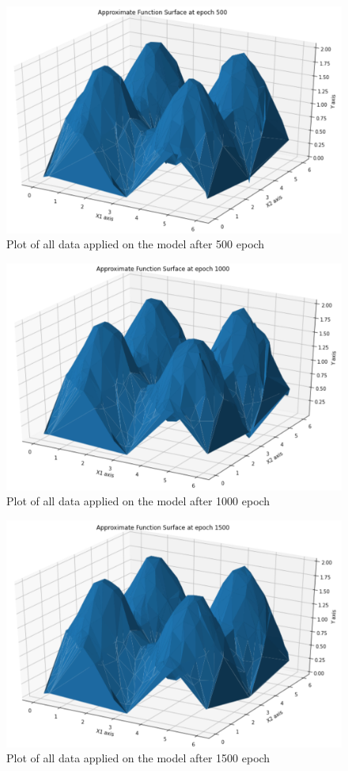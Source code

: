 \documentclass[10pt,a4paper]{article}
\begin{document}
\begin{figure}[htbp]
    \centering
    \includegraphics[width=0.8\linewidth]{Ep500.png}
    \captionsetup{justification=centering}
    \caption{Plot of all data applied on the model after 500 epoch}
\end{figure}
\begin{figure}[htbp]
    \centering
    \includegraphics[width=0.8\linewidth]{Ep1000.png}
    \captionsetup{justification=centering}
    \caption{Plot of all data applied on the model after 1000 epoch}
\end{figure}
\begin{figure}[htbp]
    \centering
    \includegraphics[width=0.8\linewidth]{Ep1500.png}
    \captionsetup{justification=centering}
    \caption{Plot of all data applied on the model after 1500 epoch}
\end{figure}
\end{document}
